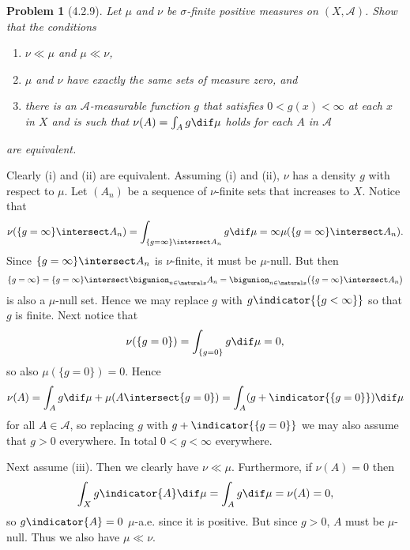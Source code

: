 \documentclass[a4paper, 11pt]{memoir}
\theoremstyle{plaincustomnumber}
\newtheorem{problem}{Problem}
\theoremstyle{changedotbreakcustomnumber}
\newcommand{\calA}{\mathcal{A}}
\begin{document}
\begin{problem}[4.2.9]
    Let $\mu$ and $\nu$ be $\sigma$-finite positive measures on $(X,\calA)$. Show that the conditions
    \begin{enumerate}
        \item $\nu \ll \mu$ and $\mu \ll \nu$,
        \item $\mu$ and $\nu$ have exactly the same sets of measure zero, and
        \item there is an $\calA$-measurable function $g$ that satisfies $0 < g(x) < \infty$ at each $x$ in $X$ and is such that $\nu(A) = \int_A g \dif\mu$ holds for each $A$ in $\calA$
    \end{enumerate}
    are equivalent.
\end{problem}

\begin{solution}
    Clearly (i) and (ii) are equivalent. Assuming (i) and (ii), $\nu$ has a density $g$ with respect to $\mu$. Let $(A_n)$ be a sequence of $\nu$-finite sets that increases to $X$. Notice that
    \begin{equation*}
        \nu(\{g = \infty\} \intersect A_n)
            = \int_{\{g = \infty\} \intersect A_n} g \dif\mu
            = \infty \mu(\{g = \infty\} \intersect A_n).
    \end{equation*}
    Since $\{g = \infty\} \intersect A_n$ is $\nu$-finite, it must be $\mu$-null. But then
    \begin{equation*}
        \{g = \infty\}
            = \{g = \infty\} \intersect \bigunion_{n \in \naturals} A_n
            = \bigunion_{n \in \naturals} \bigl( \{g = \infty\} \intersect A_n \bigr)
    \end{equation*}
    is also a $\mu$-null set. Hence we may replace $g$ with $g \indicator{\{g < \infty\}}$ so that $g$ is finite. Next notice that
    \begin{equation*}
        \nu(\{g=0\})
            = \int_{\{g=0\}} g \dif\mu
            = 0,
    \end{equation*}
    so also $\mu(\{g=0\}) = 0$. Hence
    \begin{equation*}
        \nu(A)
            = \int_A g \dif\mu + \mu(A \intersect \{g=0\})
            = \int_A (g + \indicator{\{g=0\}}) \dif\mu
    \end{equation*}
    for all $A \in \calA$, so replacing $g$ with $g + \indicator{\{g=0\}}$ we may also assume that $g > 0$ everywhere. In total $0 < g < \infty$ everywhere.

    Next assume (iii). Then we clearly have $\nu \ll \mu$. Furthermore, if $\nu(A) = 0$ then
    \begin{equation*}
        \int_X g \indicator{A} \dif\mu
            = \int_A g \dif\mu
            = \nu(A)
            = 0,
    \end{equation*}
    so $g \indicator{A} = 0$ $\mu$-a.e. since it is positive. But since $g > 0$, $A$ must be $\mu$-null. Thus we also have $\mu \ll \nu$.
\end{solution}
\end{document}
